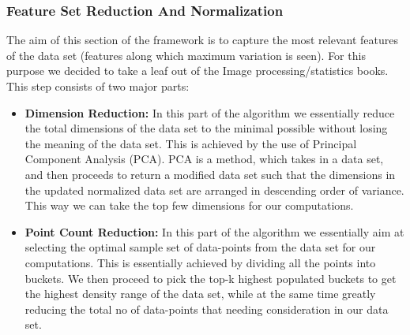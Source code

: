 \documentclass{vldb}
\begin{document}
\subsubsection{Feature Set Reduction And Normalization}
\label{fet_set_red}
The aim of this section of the framework is to capture the most relevant features of the data set (features along which maximum variation is seen). For this purpose we decided to take a leaf out of the Image processing/statistics books. This step consists of two major parts:
\begin{itemize}
    \item \textbf{Dimension Reduction:} In this part of the algorithm we essentially reduce the total dimensions of the data set to the minimal possible without losing the meaning of the data set. This is achieved by the use of Principal Component Analysis (PCA)\cite{pca}\cite{pca_visual}. PCA is a method, which takes in a data set, and then proceeds to return a modified data set such that the dimensions in the updated normalized data set are arranged in descending order of variance. This way we can take the top few dimensions for our computations.
    \item \textbf{Point Count Reduction:} In this part of the algorithm we essentially aim at selecting the optimal sample set of data-points from the data set for our computations. This is essentially achieved by dividing all the points into buckets. We then proceed to pick the top-k highest populated buckets to get the highest density range of the data set, while at the same time greatly reducing the total no of data-points that needing consideration in our data set.
\end{itemize}
\end{document}
